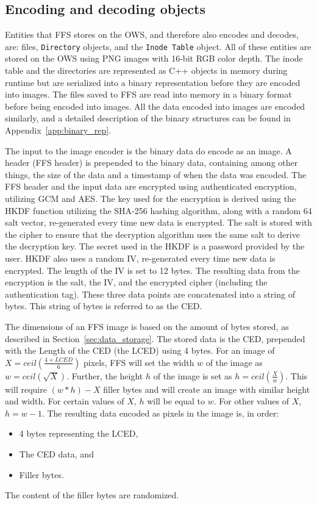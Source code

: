 \subsection{Encoding and decoding objects}
\label{subsec:file_enc_dec}
Entities that \gls{FFS} stores on the \gls{OWS}, and therefore also encodes and decodes, are: files, \texttt{Directory} objects, and the \texttt{Inode Table} object. All of these entities are stored on the \gls{OWS} using PNG images with \mbox{16-bit} \gls{RGB} color depth. The inode table and the directories are represented as C++ objects in memory during runtime but are serialized into a binary representation before they are encoded into images. The files saved to \gls{FFS} are read into memory in a binary format before being encoded into images. All the data encoded into images are encoded similarly, and a detailed description of the binary structures can be found in Appendix~\ref{app:binary_rep}. 

The input to the image encoder is the binary data do encode as an image. A header (\gls{FFS} header) is prepended to the binary data, containing among other things, the size of the data and a timestamp of when the data was encoded. The \gls{FFS} header and the input data are encrypted using authenticated encryption, utilizing \gls{GCM} and \gls{AES}. The key used for the encryption is derived using the \gls{HKDF} function utilizing the \gls{SHA}-256 hashing algorithm, along with a random \SI{64}{\byte} salt vector, \mbox{re-generated} every time new data is encrypted. The salt is stored with the cipher to ensure that the decryption algorithm uses the same salt to derive the decryption key. The secret used in the \gls{HKDF} is a password provided by the user. \gls{HKDF} also uses a random \gls{IV}, \mbox{re-generated} every time new data is encrypted. The length of the \gls{IV} is set to 12 bytes. The resulting data from the encryption is the salt, the \gls{IV}, and the encrypted cipher (including the authentication tag). These three data points are concatenated into a string of bytes. This string of bytes is referred to as the \gls{CED}.

The dimensions of an \gls{FFS} image is based on the amount of bytes stored, as described in Section~\ref{sec:data_storage}. The stored data is the CED, prepended with the Length of the \gls{CED} (the \gls{LCED}) using 4 bytes. For an image of $X = ceil(\frac{4 + LCED}{6})$ pixels, \gls{FFS} will set the width $w$ of the image as $w = ceil(\sqrt{X})$. Further, the height $h$ of the image is set as $h = ceil(\frac{X}{w})$. This will require $(w * h) - X$ filler bytes and will create an image with similar height and width. For certain values of $X$, $h$ will be equal to $w$. For other values of $X$, $h = w-1$. The resulting data encoded as pixels in the image is, in order:
\begin{itemize}
	\item 4 bytes representing the \gls{LCED},
	\item The \gls{CED} data, and
	\item Filler bytes.
\end{itemize}
The content of the filler bytes are randomized.

